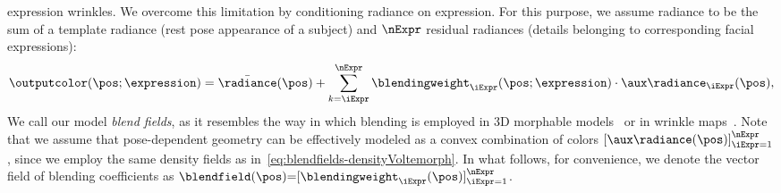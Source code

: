     expression wrinkles.
    We overcome this limitation by conditioning radiance on expression.
    For this purpose, we assume radiance to be the sum of a template radiance (\ie rest pose appearance of a subject) and $\nExpr$ residual radiances (\ie details belonging to corresponding facial expressions):
    \begin{equation}
      \outputcolor(\pos; \expression) = \bar\radiance(\pos) + \sum_{k=\iExpr}^\nExpr
      \blendingweight_\iExpr(\pos; \expression)
      \cdot
      \aux\radiance_\iExpr(\pos),
      \label{eq:blendfields-multiheadradiance}
    \end{equation}
    We call our model \textit{blend fields}, as it resembles the way in which
    blending is employed in 3D morphable models~\cite{blanz1999morphable} or in
    wrinkle maps~\cite{oat2007animated}.
    Note that we assume that pose-dependent geometry can be effectively modeled as
      {a convex combination of colors $[\aux\radiance(\pos)]_{\iExpr=1}^{\nExpr}$},
    since we employ the same density fields as
    in~\cref{eq:blendfields-densityVoltemorph}.
    In what follows, for convenience, we denote the vector field of blending
    coefficients as $\blendfield(\pos) {=}
      [\blendingweight_\iExpr(\pos)]_{\iExpr=1}^{\nExpr}$.

